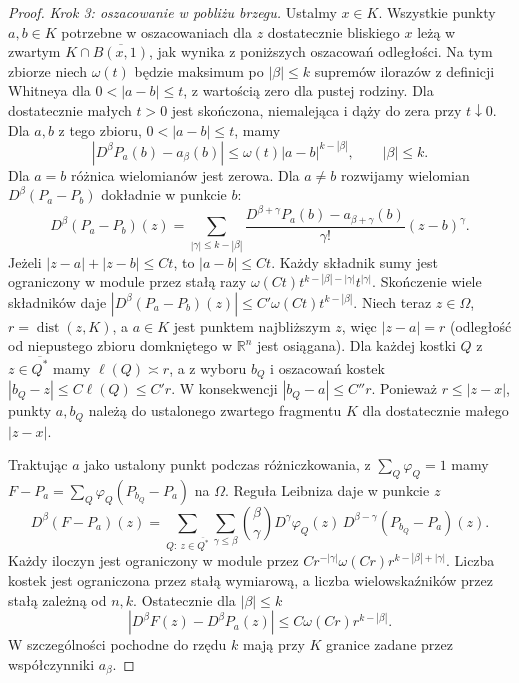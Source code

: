 \begin{proof}
\emph{Krok 3: oszacowanie w pobliżu brzegu.}
Ustalmy $x\in K$. Wszystkie punkty $a,b\in K$
potrzebne w oszacowaniach dla $z$ dostatecznie
bliskiego $x$ leżą w zwartym $K\cap\overline{B(x,1)}$,
jak wynika z poniższych oszacowań odległości.
Na tym zbiorze niech $\omega(t)$ będzie maksimum
po $|\beta|\le k$ supremów ilorazów z definicji
Whitneya dla $0<|a-b|\le t$, z wartością zero
dla pustej rodziny. Dla dostatecznie małych $t>0$
jest skończona, niemalejąca i dąży do zera
przy $t\downarrow0$. Dla $a,b$ z tego zbioru,
$0<|a-b|\le t$, mamy
\[
 |D^\beta P_a(b)-a_\beta(b)|
 \le\omega(t)|a-b|^{k-|\beta|},\qquad |\beta|\le k.
\]
Dla $a=b$ różnica wielomianów jest zerowa.
Dla $a\ne b$ rozwijamy wielomian $D^\beta(P_a-P_b)$
dokładnie w punkcie $b$:
\[
 D^\beta(P_a-P_b)(z)
 =\sum_{|\gamma|\le k-|\beta|}
 \frac{D^{\beta+\gamma}P_a(b)-a_{\beta+\gamma}(b)}
 {\gamma!}(z-b)^\gamma.
\]
Jeżeli $|z-a|+|z-b|\le Ct$, to $|a-b|\le Ct$.
Każdy składnik sumy jest ograniczony w module
przez stałą razy
$\omega(Ct)t^{k-|\beta|-|\gamma|}t^{|\gamma|}$.
Skończenie wiele składników daje
$|D^\beta(P_a-P_b)(z)|\le C'\omega(Ct)t^{k-|\beta|}$.
Niech teraz $z\in\Omega$, $r=\operatorname{dist}(z,K)$,
a $a\in K$ jest punktem najbliższym $z$, więc
$|z-a|=r$ (odległość od niepustego zbioru domkniętego
w $\mathbb R^n$ jest osiągana). Dla każdej kostki
$Q$ z $z\in\overline{Q^*}$ mamy $\ell(Q)\asymp r$,
a z wyboru $b_Q$ i oszacowań kostek
$|b_Q-z|\le C\ell(Q)\le C'r$. W konsekwencji
$|b_Q-a|\le C''r$. Ponieważ $r\le|z-x|$,
punkty $a,b_Q$ należą do ustalonego zwartego
fragmentu $K$ dla dostatecznie małego $|z-x|$.

Traktując $a$ jako ustalony punkt podczas
różniczkowania, z $\sum_Q\varphi_Q=1$ mamy
$F-P_a=\sum_Q\varphi_Q(P_{b_Q}-P_a)$ na $\Omega$.
Reguła Leibniza daje w punkcie $z$
\[
 D^\beta(F-P_a)(z)
 =\sum_{Q:\ z\in\overline{Q^*}}\sum_{\gamma\le\beta}
 \binom{\beta}{\gamma}
 D^\gamma\varphi_Q(z)\,
 D^{\beta-\gamma}(P_{b_Q}-P_a)(z).
\]
Każdy iloczyn jest ograniczony w module przez
$C r^{-|\gamma|}\omega(Cr)r^{k-|\beta|+|\gamma|}$.
Liczba kostek jest ograniczona przez stałą
wymiarową, a liczba wielowskaźników przez stałą
zależną od $n,k$. Ostatecznie dla $|\beta|\le k$
\[
 |D^\beta F(z)-D^\beta P_a(z)|
 \le C\omega(Cr)r^{k-|\beta|}.
\]
W szczególności pochodne do rzędu $k$ mają przy $K$
granice zadane przez współczynniki $a_\beta$.


\end{proof}
